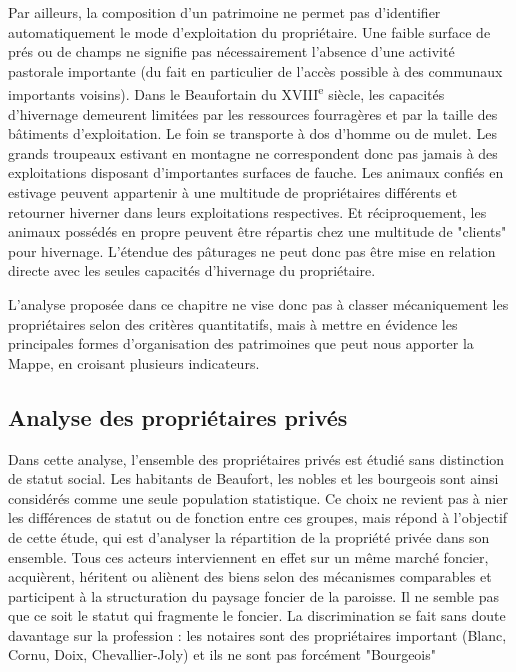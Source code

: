 \documentclass[12pt,a4paper]{report}
\begin{document}
	Par ailleurs, la composition d'un patrimoine ne permet pas d'identifier automatiquement le mode d'exploitation du propriétaire. Une faible surface de prés ou de champs ne signifie pas nécessairement l'absence d'une activité pastorale importante (du fait en particulier de l'accès possible à des communaux importants voisins). Dans le Beaufortain du XVIII\textsuperscript{e} siècle, les capacités d'hivernage demeurent limitées par les ressources fourragères et par la taille des bâtiments d'exploitation. Le foin se transporte à dos d'homme ou de mulet. Les grands troupeaux estivant en montagne ne correspondent donc pas jamais à des exploitations disposant d'importantes surfaces de fauche. Les animaux confiés en estivage peuvent appartenir à une multitude de propriétaires différents et retourner hiverner dans leurs exploitations respectives. Et réciproquement, les animaux possédés en propre peuvent être répartis chez une multitude de "clients" pour hivernage. L'étendue des pâturages ne peut donc pas être mise en relation directe avec les seules capacités d'hivernage du propriétaire.
	
	
	L'analyse proposée dans ce chapitre ne vise donc pas à classer mécaniquement les propriétaires selon des critères quantitatifs, mais à mettre en évidence les principales formes d'organisation des patrimoines que peut nous apporter la Mappe, en croisant plusieurs indicateurs.
	
	
	
	
	
	\subsection{Analyse des propriétaires privés}
	
	Dans cette analyse, l'ensemble des propriétaires privés est étudié sans distinction de statut social. Les habitants de Beaufort, les nobles et  les bourgeois  sont ainsi considérés comme une seule population statistique. Ce choix ne revient pas à nier les différences de statut ou de fonction entre ces groupes, mais répond à l'objectif de cette étude, qui est d'analyser la répartition de la propriété privée dans son ensemble. Tous ces acteurs interviennent en effet sur un même marché foncier, acquièrent, héritent ou aliènent des biens selon des mécanismes comparables et participent à la structuration du paysage foncier de la paroisse. Il ne semble pas que ce soit le statut qui fragmente le foncier. La discrimination se fait sans doute davantage sur la profession : les notaires sont des propriétaires important (Blanc, Cornu, Doix, Chevallier-Joly) et ils ne sont pas forcément "Bourgeois" 
	
\end{document}
